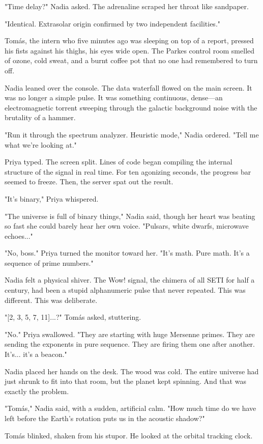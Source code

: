 \documentclass[11pt,a5paper,twoside]{book}
\begin{document}
"Time delay?" Nadia asked. The adrenaline scraped her throat like sandpaper.

"Identical. Extrasolar origin confirmed by two independent facilities."

Tomás, the intern who five minutes ago was sleeping on top of a report, pressed his fists against his thighs, his eyes wide open. The Parkes control room smelled of ozone, cold sweat, and a burnt coffee pot that no one had remembered to turn off.

Nadia leaned over the console. The data waterfall flowed on the main screen. It was no longer a simple pulse. It was something continuous, dense—an electromagnetic torrent sweeping through the galactic background noise with the brutality of a hammer.

"Run it through the spectrum analyzer. Heuristic mode," Nadia ordered. "Tell me what we're looking at."

Priya typed. The screen split. Lines of code began compiling the internal structure of the signal in real time. For ten agonizing seconds, the progress bar seemed to freeze. Then, the server spat out the result.

"It's binary," Priya whispered.

"The universe is full of binary things," Nadia said, though her heart was beating so fast she could barely hear her own voice. "Pulsars, white dwarfs, microwave echoes..."

"No, boss." Priya turned the monitor toward her. "It's math. Pure math. It's a sequence of prime numbers."

Nadia felt a physical shiver. The Wow! signal, the chimera of all SETI for half a century, had been a stupid alphanumeric pulse that never repeated. This was different. This was deliberate.

"[2, 3, 5, 7, 11]...?" Tomás asked, stuttering.

"No." Priya swallowed. "They are starting with huge Mersenne primes. They are sending the exponents in pure sequence. They are firing them one after another. It's... it's a beacon."

Nadia placed her hands on the desk. The wood was cold. The entire universe had just shrunk to fit into that room, but the planet kept spinning. And that was exactly the problem.

"Tomás," Nadia said, with a sudden, artificial calm. "How much time do we have left before the Earth's rotation puts us in the acoustic shadow?"

Tomás blinked, shaken from his stupor. He looked at the orbital tracking clock.
\end{document}
